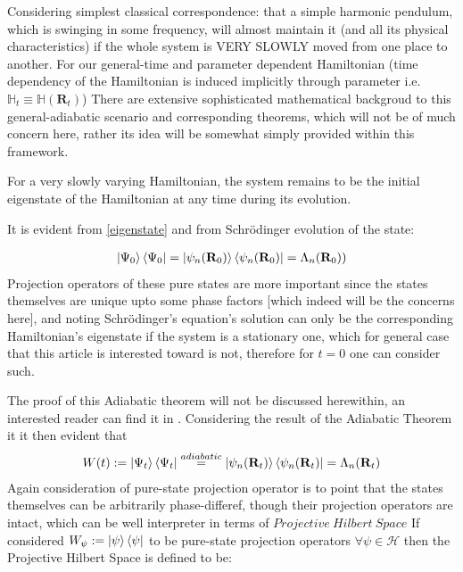 \documentclass[8pt, twocoloumn]{article}
\begin{document}
Considering simplest classical correspondence: that a simple harmonic pendulum, which is swinging in some frequency, will almost maintain it (and all its physical characteristics) if the whole system is VERY SLOWLY moved from one place to another. For our general-time and parameter dependent Hamiltonian (time dependency of the Hamiltonian is induced implicitly through parameter i.e. $ \mathbb{H}_t \equiv \mathbb{H}(\textbf{R}_t)$)
There are extensive sophisticated mathematical backgroud to this general-adiabatic scenario and corresponding theorems, which will not be of much concern here, rather its idea will be somewhat simply provided within this framework. 
\begin{definition1}
For a very slowly varying Hamiltonian, the system remains to be the initial eigenstate of the Hamiltonian at any time during its evolution.
\end{definition1}
It is evident from \ref{eigenstate} and from Schrödinger evolution of the state: 

\begin{align}
\ket{\Psi_0}\bra{\Psi_0} = \ket{\psi_n(\textbf{R}_0)}\bra{\psi_n(\textbf{R}_0)} = \Lambda_n(\textbf{R}_0))
\end{align}
Projection operators of these pure states are more important since the states themselves are unique upto some phase factors [which indeed will be the concerns here], and noting Schrödinger's equation's solution can only be the corresponding Hamiltonian's eigenstate if the system is a stationary one, which for general case that this article is interested toward is not, therefore for $t=0$ one can consider such.

The proof of this Adiabatic theorem will not be discussed herewithin, an interested reader can find it in \cite{adiabaticberry}. Considering the result of the Adiabatic Theorem it it then evident that
\begin{align}{\label{we}}
W(t) := \ket{\Psi_t}\bra{\Psi_t} \overset{adiabatic}{=} \ket{\psi_n(\textbf{R}_t)}\bra{\psi_n(\textbf{R}_t)}=\Lambda_n(\textbf{R}_t)
\end{align}
Again consideration of pure-state projection operator is to point that the states themselves can be arbitrarily phase-differef, though their projection operators are intact, which can be well interpreter in terms of $Projective \ Hilbert \ Space$
If considered $W_{\psi} := \ket{\psi}\bra{\psi}$ to be pure-state projection operators $\forall \psi \in \mathcal{H}$
then the Projective Hilbert Space is defined to be: 
\end{document}
